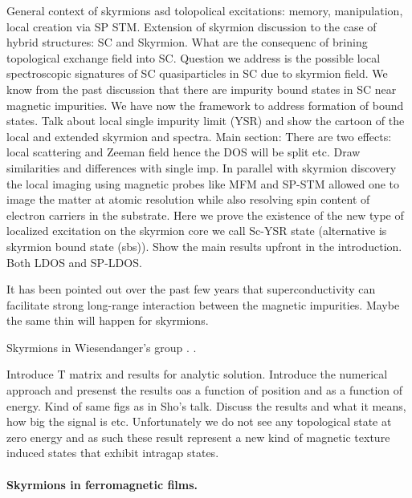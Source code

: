 \documentclass[twocolumn,showpacs,floatfix,nofootinbib,longbibliography]{revtex4-1}
\begin{document}
General context of skyrmions asd tolopolical excitations: memory, manipulation, local creation via SP STM.
Extension of skyrmion discussion to the case of hybrid structures: SC and Skyrmion. What are the consequenc of brining topological exchange field into SC. Question we address is the possible local spectroscopic signatures of SC quasiparticles in SC due to skyrmion field. We know from the past discussion that there are impurity bound states in SC near magnetic impurities. We have now the framework to address formation of bound states. Talk about local single impurity limit (YSR) and show the cartoon of the local and extended skyrmion and spectra.
Main section:
There are two effects: local scattering and Zeeman field hence the DOS will be split etc.  Draw similarities and differences with single imp.
In parallel with skyrmion discovery the local imaging using magnetic probes like MFM and SP-STM allowed one to image the matter at atomic resolution while also resolving spin content of electron carriers in the substrate.
Here we prove the existence of the new type of localized excitation on the skyrmion core we call  Sc-YSR state (alternative is skyrmion bound state (sbs)).  Show the main results upfront in the introduction. Both LDOS and SP-LDOS.


It has been pointed out over the past few years \cite{Yao2014,Menard2015} that superconductivity can facilitate strong long-range interaction between the magnetic impurities. Maybe the same thin will happen for skyrmions.

Skyrmions in Wiesendanger's group \cite{Heinze2011,Romming2013,Bergmann2014,Brede2014,Sonntag2014,vonBergmann2015,Romming2015}.
.


Introduce T matrix and results for analytic solution.
Introduce the numerical approach and presenst the results oas a function of position and as a function of energy. Kind of same figs as in Sho’s talk.
Discuss the results and what it means, how big the signal is etc. Unfortunately we do not see any topological state at zero energy and as such these result represent a new kind of magnetic texture induced states that exhibit intragap states.



\paragraph*{Skyrmions in ferromagnetic films.} \label{sec:skyrmion}
\end{document}
